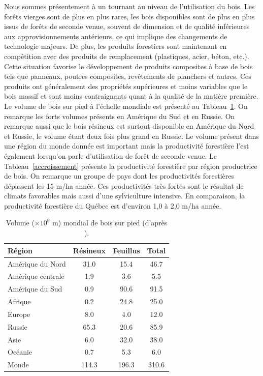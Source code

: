 Nous sommes présentement à un tournant au niveau de l'utilisation du bois. Les forêts vierges sont de plus en plus rares, les bois disponibles sont de plus en plus issus de forêts de seconde venue, souvent de dimension et de qualité inférieures aux approvisionnements antérieurs, ce qui implique des changements de technologie majeurs. De plus, les produits forestiers sont maintenant en compétition avec des produits de remplacement (plastiques, acier, béton, etc.). Cette situation favorise le développement de produits composites à base de bois tels que panneaux, poutres composites, revêtements de planchers et autres. Ces produits ont généralement des propriétés supérieures et moins variables que le bois massif et sont moins contraignants quant à la qualité de la matière première.\\

Le volume de bois sur pied à l'échelle mondiale est présenté au Tableau~\ref{volume}. On remarque les forts volumes présents en Amérique du Sud et en Russie. On remarque aussi que le bois résineux est surtout disponible en Amérique du Nord et Russie, le volume étant deux fois plus grand en Russie. Le volume présent dans une région du monde donnée est important mais la productivité forestière l'est également lorsqu'on parle d'utilisation de forêt de seconde venue. Le Tableau~\ref{accroissement} présente la productivité forestière par région productrice de bois. On remarque un groupe de pays dont les productivités forestières dépassent les 15 m/ha année. Ces productivités très fortes sont le résultat de climats favorables mais aussi d'une sylviculture intensive. En comparaison, la productivité forestière du Québec est d'environ 1,0 à 2,0 m/ha année.

\begin{table}[ht]
\centering
	
	\begin{tabular}{l c c c}
	\hline
	\bf Région & \bf Résineux & \bf Feuillus & \bf Total \\
	\hline
	\hline
	Amérique du Nord & 31.0 & 15.4 & 46.7\\
	Amérique centrale & 1.9 & 3.6 & 5.5\\
	Amérique du Sud & 0.9 & 90.6 & 91.5 \\
	Afrique & 0.2 & 24.8 & 25.0 \\
	Europe & 8.0 & 4.0 & 12.0 \\
	Russie & 65.3 & 20.6 & 85.9 \\
	Asie & 6.0 & 32.0 & 38.0\\
	Océanie	& 0.7 & 5.3 & 6.0 \\
	\hline
	Monde & 114.3 & 196.3 & 310.6 \\	
	\hline
	\end{tabular}

\caption{\label{volume} Volume ($\times10^9$ m) mondial de bois sur pied (d'après \cite{MRN1996}).}
\end{table}


